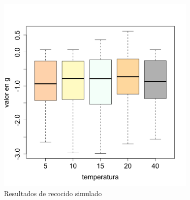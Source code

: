 \documentclass[12pt, letterpaper] {article}
\begin{document}
\begin{figure}[H]
\centering\includegraphics[width=98mm]{Dimarb.png}
\caption{Resultados de recocido simulado}
\label{FRSS}
\end{figure}




\end{document}
